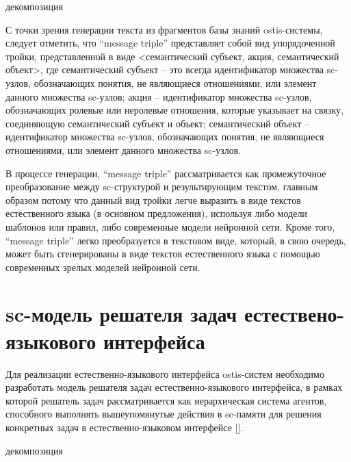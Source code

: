 \begin{SCn}
	\begin{scnrelfromset}{декомпозиция}
	\end{scnrelfromset}
\end{SCn}

С точки зрения генерации текста из фрагментов базы знаний ostis-системы, следует отметить, что ``message triple'' представляет собой вид упорядоченной тройки, представленной в виде <семантический субъект, акция, семантический объект>, где семантический субъект -- это всегда идентификатор множества sc-узлов, обозначающих понятия, не являющиеся отношениями, или элемент данного множества sc-узлов; акция -- идентификатор множества sc-узлов, обозначающих ролевые или неролевые отношения, которые указывает на связку, соединяющую семантический субъект и объект; семантический объект -- идентификатор множества sc-узлов, обозначающих понятия, не являющиеся отношениями, или элемент данного множества sc-узлов.

В процессе генерации, ``message triple'' рассматривается как промежуточное преобразование между sc-структурой и результирующим текстом, главным образом потому что данный вид тройки легче выразить в виде текстов естественного языка (в основном предложения), используя либо модели шаблонов или правил, либо современные модели нейронной сети. Кроме того, ``message triple'' легко преобразуется в текстовом виде, который, в свою очередь, может быть сгенерированы в виде текстов естественного языка с помощью современных зрелых моделей нейронной сети.

\section{sc-модель решателя задач естествено-языкового интерфейса}
Для реализации естественно-языкового интерфейса ostis-систем необходимо разработать модель решателя задач естественно-языкового интерфейса, в рамках которой решатель задач рассматривается как иерархическая система агентов, способного выполнять вышеупомянутые действия в sc-памяти для решения конкретных задач в естественно-языковом интерфейсе [].
\begin{SCn}
	\begin{scnrelfromset}{декомпозиция}
	\end{scnrelfromset}
\end{SCn}

